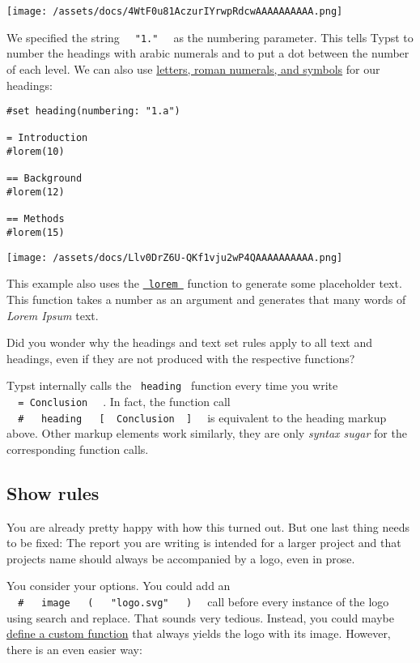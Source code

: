 \texttt{[image: /assets/docs/4WtF0u81AczurIYrwpRdcwAAAAAAAAAA.png]}

We specified the string \texttt{\ }{\texttt{\ "1."\ }}\texttt{\ } as the
numbering parameter. This tells Typst to number the headings with arabic
numerals and to put a dot between the number of each level. We can also
use \href{/docs/reference/model/numbering/}{letters, roman numerals, and
symbols} for our headings:

\begin{verbatim}
#set heading(numbering: "1.a")

= Introduction
#lorem(10)

== Background
#lorem(12)

== Methods
#lorem(15)
\end{verbatim}

\texttt{[image: /assets/docs/Llv0DrZ6U-QKf1vju2wP4QAAAAAAAAAA.png]}

This example also uses the
\href{/docs/reference/text/lorem/}{\texttt{\ lorem\ }} function to
generate some placeholder text. This function takes a number as an
argument and generates that many words of \emph{Lorem Ipsum} text.

Did you wonder why the headings and text set rules apply to all text and
headings, even if they are not produced with the respective functions?

Typst internally calls the \texttt{\ heading\ } function every time you
write \texttt{\ }{\texttt{\ =\ Conclusion\ }}\texttt{\ } . In fact, the
function call
\texttt{\ }{\texttt{\ \#\ }}\texttt{\ }{\texttt{\ heading\ }}\texttt{\ }{\texttt{\ {[}\ }}\texttt{\ Conclusion\ }{\texttt{\ {]}\ }}\texttt{\ }
is equivalent to the heading markup above. Other markup elements work
similarly, they are only \emph{syntax sugar} for the corresponding
function calls.

\subsection{Show rules}\label{show-rules}

You are already pretty happy with how this turned out. But one last
thing needs to be fixed: The report you are writing is intended for a
larger project and that project\textquotesingle s name should always be
accompanied by a logo, even in prose.

You consider your options. You could add an
\texttt{\ }{\texttt{\ \#\ }}\texttt{\ }{\texttt{\ image\ }}\texttt{\ }{\texttt{\ (\ }}\texttt{\ }{\texttt{\ "logo.svg"\ }}\texttt{\ }{\texttt{\ )\ }}\texttt{\ }
call before every instance of the logo using search and replace. That
sounds very tedious. Instead, you could maybe
\href{/docs/reference/foundations/function/\#defining-functions}{define
a custom function} that always yields the logo with its image. However,
there is an even easier way:

